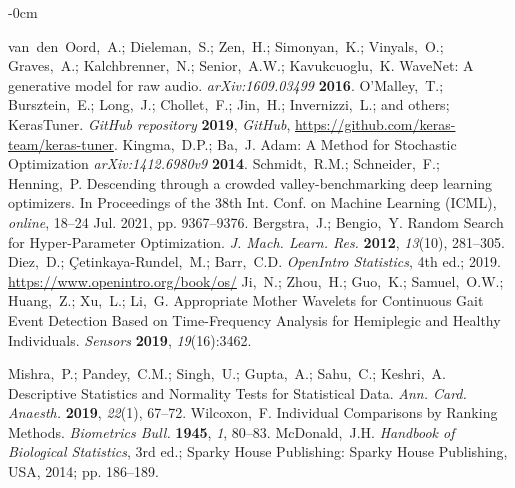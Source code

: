 \documentclass[sensors,article,submit,pdftex,moreauthors]{Definitions/mdpi}
\begin{document}
\begin{adjustwidth}{-\extralength}{0cm}
\begin{thebibliography}{999}
	van~den~Oord,~A.; Dieleman,~S.; Zen,~H.; Simonyan,~K.; Vinyals,~O.; Graves,~A.; Kalchbrenner,~N.; Senior,~A.W.; Kavukcuoglu,~K. WaveNet: A generative model for raw audio. {\em arXiv:1609.03499} {\bf 2016}.
	O'Malley,~T.; Bursztein,~E.; Long,~J.; Chollet,~F.; Jin,~H.; Invernizzi,~L.; and others; KerasTuner. {\em GitHub repository} {\bf 2019}, {\em GitHub}, \url{https://github.com/keras-team/keras-tuner}.
	Kingma,~D.P.; Ba,~J. Adam: A Method for Stochastic Optimization {\em arXiv:1412.6980v9} {\bf 2014}.
	Schmidt,~R.M.; Schneider,~F.; Henning,~P. Descending through a crowded valley-benchmarking deep learning optimizers. In Proceedings of the 38th Int. Conf. on Machine Learning (ICML), {\em online}, 18--24 Jul. 2021, pp. 9367--9376.
	Bergstra,~J.; Bengio,~Y. Random Search for Hyper-Parameter Optimization. {\em J. Mach. Learn. Res.} {\bf 2012}, {\em 13}(10), 281--305.
	Diez,~D.; \c{C}etinkaya-Rundel,~M.; Barr,~C.D. \textit{OpenIntro Statistics}, 4th ed.; 2019. \url{https://www.openintro.org/book/os/}
	Ji,~N.; Zhou,~H.; Guo,~K.; Samuel,~O.W.; Huang,~Z.; Xu,~L.; Li,~G. Appropriate Mother Wavelets for Continuous Gait Event Detection Based on Time-Frequency Analysis for Hemiplegic and Healthy Individuals. {\em Sensors} {\bf 2019}, {\em 19}(16):3462.
	
	Mishra,~P.; Pandey,~C.M.; Singh,~U.; Gupta,~A.; Sahu,~C.; Keshri,~A. Descriptive Statistics and Normality Tests for Statistical Data. {\em Ann. Card. Anaesth.} {\bf 2019}, {\em 22}(1), 67--72. 	
	Wilcoxon,~F. Individual Comparisons by Ranking Methods. {\em Biometrics Bull.} {\bf 1945}, {\em 1}, 80--83.
	McDonald,~J.H. \textit{Handbook of Biological Statistics}, 3rd ed.; Sparky House Publishing: Sparky House Publishing, USA, 2014; pp. 186--189.
\end{thebibliography}

%


\end{adjustwidth}
\end{document}

